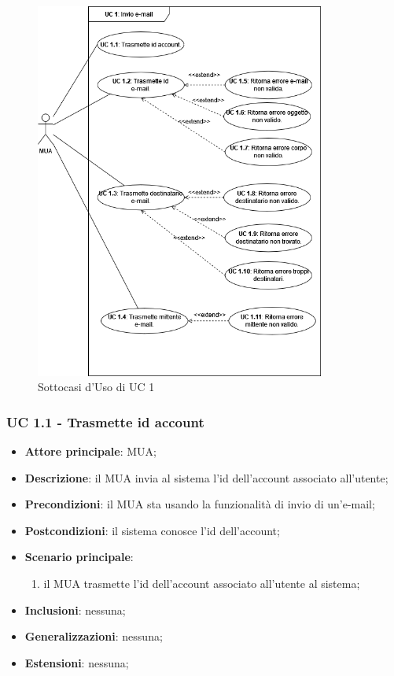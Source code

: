     \begin{figure}[H]
        \includegraphics[width=0.85\textwidth]{sections/uc_imgs/UC01.png}
        \centering
        \caption{Sottocasi d'Uso di UC 1}
    \end{figure}

    \subsubsection{UC 1.1 - Trasmette id account} \label{sec:UC1.1}
    \begin{itemize}
        \item \textbf{Attore principale}: MUA;
        \item \textbf{Descrizione}: il MUA invia al sistema l'id dell'account associato all'utente;
        \item \textbf{Precondizioni}: il MUA sta usando la funzionalità di invio di un'e-mail;
        \item \textbf{Postcondizioni}: il sistema conosce l'id dell'account;
        \item \textbf{Scenario principale}:
            \begin{enumerate}
                \item il MUA trasmette l'id dell'account associato all'utente al sistema;
            \end{enumerate}
        \item \textbf{Inclusioni}: nessuna;
        \item \textbf{Generalizzazioni}: nessuna;
        \item \textbf{Estensioni}: nessuna;
    \end{itemize}


